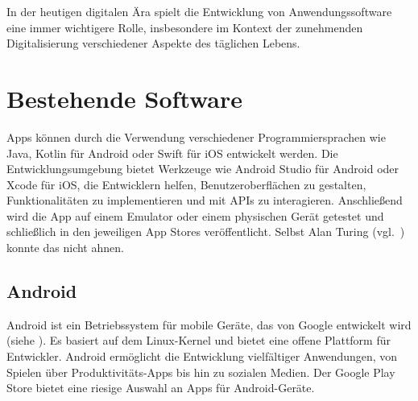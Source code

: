 In der heutigen digitalen Ära spielt die Entwicklung von Anwendungssoftware eine immer wichtigere Rolle, insbesondere im Kontext der zunehmenden Digitalisierung verschiedener Aspekte des täglichen Lebens.


\section{Bestehende Software}
Apps können durch die Verwendung verschiedener Programmiersprachen wie Java, Kotlin für Android oder Swift für iOS entwickelt werden. Die Entwicklungsumgebung bietet Werkzeuge wie Android Studio für Android oder Xcode für iOS, die Entwicklern helfen, Benutzeroberflächen zu gestalten, Funktionalitäten zu implementieren und mit APIs zu interagieren. Anschließend wird die App auf einem Emulator oder einem physischen Gerät getestet und schließlich in den jeweiligen App Stores veröffentlicht. Selbst Alan Turing (vgl.~\cite{Turing1936}) konnte das nicht ahnen.


\subsection{Android}
Android ist ein Betriebssystem für mobile Geräte, das von Google entwickelt wird (siehe \cite{android}). Es basiert auf dem Linux-Kernel und bietet eine offene Plattform für Entwickler. Android ermöglicht die Entwicklung vielfältiger Anwendungen, von Spielen über Produktivitäts-Apps bis hin zu sozialen Medien. Der Google Play Store bietet eine riesige Auswahl an Apps für Android-Geräte.

